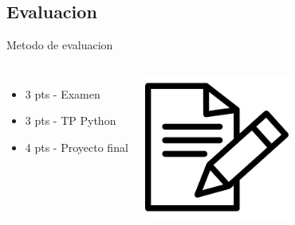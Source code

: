 \subsection{Evaluacion}
\begin{frame}{Metodo de evaluacion}{}
   \begin{columns}[onlytextwidth]
      \begin{itemize}
         \item  3 pts - Examen
         \item  3 pts - TP Python
         \item  4 pts - Proyecto final
      \end{itemize}
      \center\includegraphics[width=0.8\textwidth]{1_clase/exam_icon}
   \end{columns}
   \vfill
\end{frame}
